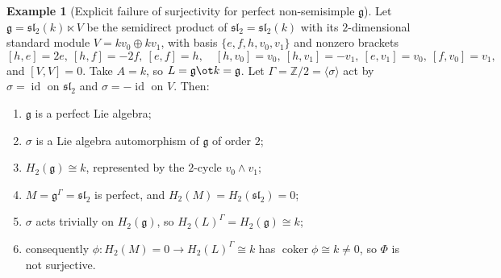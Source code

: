 \documentclass{amsart}
\theoremstyle{definition}
\newtheorem{example}{Example}
\DeclareMathOperator{\id}{id}
\newcommand{\g}{\mathfrak{g}}
\newcommand{\sw}{\mathfrak{sl}}
\newcommand{\Gm}{\Gamma}
\newcommand{\ra}{\rightarrow}
\begin{document}
\begin{example}[Explicit failure of surjectivity for perfect non-semisimple $\g$]
\label{ex:fail}
Let $\g=\sw_2(k)\ltimes V$ be the semidirect product of $\sw_2=\sw_2(k)$ with its
$2$-dimensional standard module $V=k v_0\oplus k v_1$, with basis
$\{e,f,h,v_0,v_1\}$ and nonzero brackets
\[
   [h,e]=2e,\ [h,f]=-2f,\ [e,f]=h,\quad
   [h,v_0]=v_0,\ [h,v_1]=-v_1,\ [e,v_1]=v_0,\ [f,v_0]=v_1,
\]
and $[V,V]=0$.  Take $A=k$, so $L=\g\ot k=\g$.  Let $\Gm=\mathbb Z/2=
\langle\sigma\rangle$ act by $\sigma=\id$ on $\sw_2$ and $\sigma=-\id$ on $V$.
Then:
\begin{enumerate}
\item[(i)] $\g$ is a perfect Lie algebra;
\item[(ii)] $\sigma$ is a Lie algebra automorphism of $\g$ of order $2$;
\item[(iii)] $H_2(\g)\cong k$, represented by the $2$-cycle $v_0\wedge v_1$;
\item[(iv)] $M=\g^{\Gm}=\sw_2$ is perfect, and $H_2(M)=H_2(\sw_2)=0$;
\item[(v)] $\sigma$ acts trivially on $H_2(\g)$, so $H_2(L)^{\Gm}=H_2(\g)\cong k$;
\item[(vi)] consequently $\phi\colon H_2(M)=0\ra H_2(L)^{\Gm}\cong k$ has
$\operatorname{coker}\phi\cong k\ne0$, so $\Phi$ is not surjective.
\end{enumerate}
\end{example}
\end{document}

